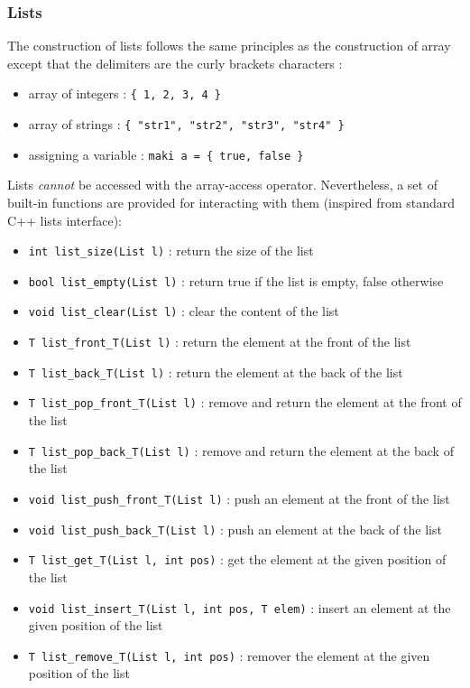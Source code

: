\documentclass[a4paper,11pt]{article}
\begin{document}
\subsubsection{Lists}
\label{sssec:lists}
The construction of lists follows the same principles as the construction of array except that the delimiters are the curly brackets characters :
\begin{itemize}
	\item array of integers : \texttt{\{ 1, 2, 3, 4 \}}
	\item array of strings : \texttt{\{ "str1", "str2", "str3", "str4" \}}
	\item assigning a variable : \texttt{maki a = \{ true, false \}}
\end{itemize}
Lists \textit{cannot} be accessed with the array-access operator. Nevertheless, a set of built-in functions are provided for interacting with them (inspired from standard C++ lists interface):
\begin{itemize}
	\item \texttt{int list\_size(List l)} : return the size of the list
	\item \texttt{bool list\_empty(List l)} : return true if the list is empty, false otherwise
	\item \texttt{void list\_clear(List l)} : clear the content of the list
	\item \texttt{T list\_front\_T(List l)} : return the element at the front of the list
	\item \texttt{T list\_back\_T(List l)} : return the element at the back of the list
	\item \texttt{T list\_pop\_front\_T(List l)} : remove and return the element at the front of the list
	\item \texttt{T list\_pop\_back\_T(List l)} : remove and return the element at the back of the list
	\item \texttt{void list\_push\_front\_T(List l)} : push an element at the front of the list
	\item \texttt{void list\_push\_back\_T(List l)} : push an element at the back of the list
	\item \texttt{T list\_get\_T(List l, int pos)} : get the element at the given position of the list
	\item \texttt{void list\_insert\_T(List l, int pos, T elem)} : insert an element at the given position of the list
	\item \texttt{T list\_remove\_T(List l, int pos)} : remover the element at the given position of the list
\end{itemize}
\end{document}
